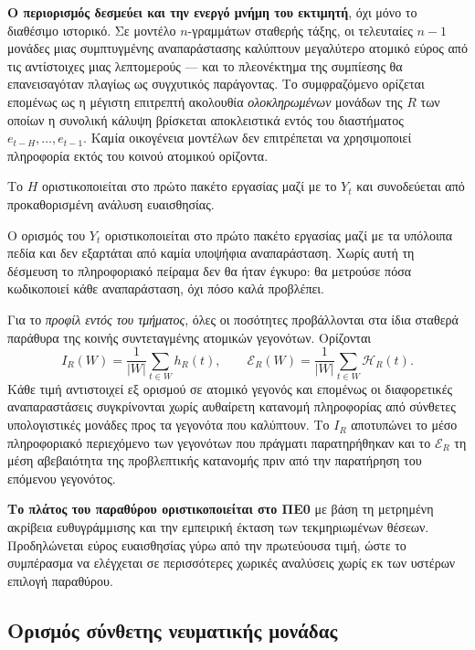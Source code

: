 \documentclass[11pt,a4paper]{article}
\begin{document}
\textbf{Ο περιορισμός δεσμεύει και την ενεργό μνήμη του εκτιμητή}, όχι μόνο το διαθέσιμο ιστορικό. Σε μοντέλο \(n\)-γραμμάτων σταθερής τάξης, οι τελευταίες \(n-1\) μονάδες μιας συμπτυγμένης αναπαράστασης καλύπτουν μεγαλύτερο ατομικό εύρος από τις αντίστοιχες μιας λεπτομερούς --- και το πλεονέκτημα της συμπίεσης θα επανεισαγόταν πλαγίως ως συγχυτικός παράγοντας. Το συμφραζόμενο ορίζεται επομένως ως η μέγιστη επιτρεπτή ακολουθία \emph{ολοκληρωμένων} μονάδων της \(R\) των οποίων η συνολική κάλυψη βρίσκεται αποκλειστικά εντός του διαστήματος \(e_{t-H},\dots,e_{t-1}\). Καμία οικογένεια μοντέλων δεν επιτρέπεται να χρησιμοποιεί πληροφορία εκτός του κοινού ατομικού ορίζοντα.

Το \(H\) οριστικοποιείται στο πρώτο πακέτο εργασίας μαζί με το \(Y_t\) και συνοδεύεται από προκαθορισμένη ανάλυση ευαισθησίας.

Ο ορισμός του \(Y_t\) οριστικοποιείται στο πρώτο πακέτο εργασίας μαζί με τα υπόλοιπα πεδία και δεν εξαρτάται από καμία υποψήφια αναπαράσταση. Χωρίς αυτή τη δέσμευση το πληροφοριακό πείραμα δεν θα ήταν έγκυρο: θα μετρούσε πόσα κωδικοποιεί κάθε αναπαράσταση, όχι πόσο καλά προβλέπει.

Για το \emph{προφίλ εντός του τμήματος}, όλες οι ποσότητες προβάλλονται στα ίδια σταθερά παράθυρα της κοινής συντεταγμένης ατομικών γεγονότων. Ορίζονται
\[
I_R(W)=\frac{1}{|W|}\sum_{t\in W} h_R(t),
\qquad
\mathcal{E}_R(W)=\frac{1}{|W|}\sum_{t\in W}\mathcal{H}_R(t).
\]
Κάθε τιμή αντιστοιχεί εξ ορισμού σε ατομικό γεγονός και επομένως οι διαφορετικές αναπαραστάσεις συγκρίνονται χωρίς αυθαίρετη κατανομή πληροφορίας από σύνθετες υπολογιστικές μονάδες προς τα γεγονότα που καλύπτουν. Το \(I_R\) αποτυπώνει το μέσο πληροφοριακό περιεχόμενο των γεγονότων που πράγματι παρατηρήθηκαν και το \(\mathcal{E}_R\) τη μέση αβεβαιότητα της προβλεπτικής κατανομής πριν από την παρατήρηση του επόμενου γεγονότος.

\textbf{Το πλάτος του παραθύρου οριστικοποιείται στο ΠΕ0} με βάση τη μετρημένη ακρίβεια ευθυγράμμισης και την εμπειρική έκταση των τεκμηριωμένων θέσεων. Προδηλώνεται εύρος ευαισθησίας γύρω από την πρωτεύουσα τιμή, ώστε το συμπέρασμα να ελέγχεται σε περισσότερες χωρικές αναλύσεις χωρίς εκ των υστέρων επιλογή παραθύρου.

\subsection{Ορισμός σύνθετης νευματικής μονάδας}\label{app:repr-compound}
\end{document}
